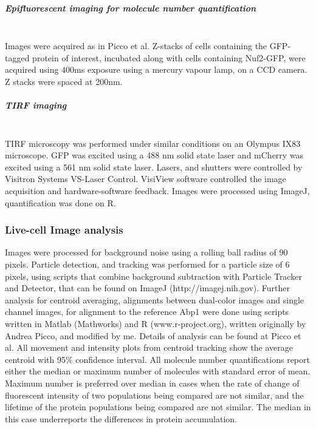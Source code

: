 \subparagraph{Epifluorescent imaging for molecule number quantification}
			\mbox{}\\
Images were acquired as in Picco et al. Z-stacks of cells containing the GFP-tagged protein of interest, incubated along with cells containing Nuf2-GFP, were acquired using 400ms exposure using a mercury vapour lamp, on a CCD camera. Z stacks were spaced at 200nm. 

\subparagraph{TIRF imaging}
			\mbox{}\\
TIRF microscopy was performed under similar conditions on an Olympus IX83 microscope. GFP was excited using a 488 nm solid state laser and mCherry was excited using a 561 nm solid state laser. Lasers, and shutters were controlled by Visitron Systems VS-Laser Control. VisiView software controlled the image acquisition and hardware-software feedback.
Images were processed using ImageJ, quantification was done on R.

\subsubsection{Live-cell Image analysis}
Images were processed for background noise using a rolling ball radius of 90 pixels. Particle detection, and tracking was performed for a particle size of 6 pixels, using scripts that combine background subtraction with Particle Tracker and Detector, that can be found on ImageJ (http://imagej.nih.gov). Further analysis for centroid averaging, alignments between dual-color images and single channel images, for alignment to the reference Abp1 were done using scripts written in Matlab (Mathworks) and R (www.r-project.org), written originally by Andrea Picco, and modified by me. Details of analysis can be found at Picco et al. All movement and intensity plots from centroid tracking show the average centroid with 95\% confidence interval. All molecule number quantifications report either the median or maximum number of molecules with standard error of mean. Maximum number is preferred over median in cases when the rate of change of fluorescent intensity of two populations being compared are not similar, and the lifetime of the protein populations being compared are not similar. The median in this case underreports the differences in protein accumulation. 


